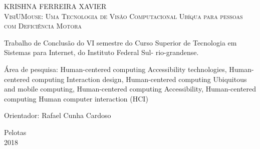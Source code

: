 \begin{titlepage}
\vfill
\begin{center}

    {\large KRISHNA FERREIRA XAVIER\\}
    \vspace{2cm}
    {\Large \textsc{VisiUMouse: Uma Tecnologia de Visão Computacional Ubíqua para pessoas com Deficiência Motora}\\}
    \vspace{1cm}
    \hspace{.45\linewidth}
    \begin{minipage}{.50\linewidth}

           Trabalho de Conclusão do VI semestre do Curso Superior de Tecnologia em Sistemas para Internet, do Instituto Federal Sul- rio-grandense.

            \vspace{0.5 cm}

            Área de pesquisa: Human-centered computing Accessibility technologies, Human-centered computing Interaction design, Human-centered computing Ubiquitous and mobile computing, Human-centered computing Accessibility, Human-centered computing Human computer interaction (HCI)

            \vspace{0.5 cm}

            Orientador: Rafael Cunha Cardoso
    
    \end{minipage}

    \vspace{2cm}
    \vfill
    {\large Pelotas\\ 2018}
\end{center}

\end{titlepage}

